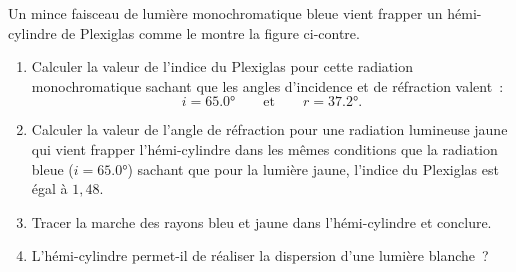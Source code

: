 \begin{minipage}{0.72\linewidth}
    Un mince faisceau de lumière monochromatique bleue vient frapper un
    hémi-cylindre de Plexiglas comme le montre la figure ci-contre.
    \begin{enumerate}
        \item Calculer la valeur de l'indice du Plexiglas pour cette radiation
              monochromatique sachant que les angles d'incidence et de
              réfraction valent~:
              \[
                  i=\ang{65.0}
                  \qquad\text{et}\qquad
                  r=\ang{37.2}.
              \]
    \end{enumerate}
\end{minipage}
\hfill
\begin{minipage}{0.24\linewidth}
    \flushright
\end{minipage}

\begin{enumerate}
    \setcounter{enumi}{1}
    \item Calculer la valeur de l'angle de réfraction pour une radiation
          lumineuse jaune qui vient frapper l'hémi-cylindre dans les mêmes
          conditions que la radiation bleue ($i=\ang{65.0}$) sachant que pour
          la lumière jaune, l'indice du Plexiglas est égal à $1,48$.
    \item Tracer la marche des rayons bleu et jaune dans l'hémi-cylindre et
          conclure.
    \item L'hémi-cylindre permet-il de réaliser la dispersion d'une lumière
          blanche~?
\end{enumerate}

